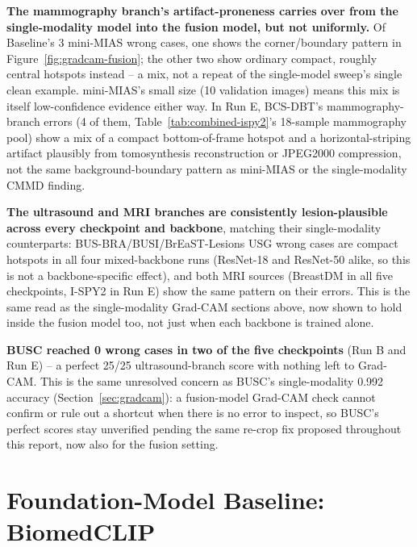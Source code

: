 \documentclass[11pt]{article}
\begin{document}
\textbf{The mammography branch's artifact-proneness carries over from the
single-modality model into the fusion model, but not uniformly.} Of
Baseline's 3 mini-MIAS wrong cases, one shows the corner/boundary pattern in
Figure~\ref{fig:gradcam-fusion}; the other two show ordinary compact,
roughly central hotspots instead -- a mix, not a repeat of the single-model
sweep's single clean example. mini-MIAS's small size (10 validation images)
means this mix is itself low-confidence evidence either way. In Run E,
BCS-DBT's mammography-branch errors (4 of them, Table~\ref{tab:combined-ispy2}'s
18-sample mammography pool) show a mix of a compact bottom-of-frame hotspot
and a horizontal-striping artifact plausibly from tomosynthesis
reconstruction or {JPEG2000} compression, not the same background-boundary
pattern as mini-MIAS or the single-modality {CMMD} finding.

\textbf{The ultrasound and {MRI} branches are consistently lesion-plausible
across every checkpoint and backbone}, matching their single-modality
counterparts: BUS-BRA/BUSI/BrEaST-Lesions {USG} wrong cases are compact
hotspots in all four mixed-backbone runs (ResNet-18 and ResNet-50 alike, so
this is not a backbone-specific effect), and both {MRI} sources (BreastDM in
all five checkpoints, {I-SPY2} in Run E) show the same pattern on their
errors. This is the same read as the single-modality Grad-CAM sections above,
now shown to hold inside the fusion model too, not just when each backbone
is trained alone.

\textbf{BUSC reached 0 wrong cases in two of the five checkpoints} (Run B
and Run E) -- a perfect 25/25 ultrasound-branch score with nothing left to
Grad-CAM. This is the same unresolved concern as BUSC's single-modality
0.992 accuracy (Section~\ref{sec:gradcam}): a fusion-model Grad-CAM check
cannot confirm or rule out a shortcut when there is no error to inspect, so
BUSC's perfect scores stay unverified pending the same re-crop fix proposed
throughout this report, now also for the fusion setting.

\section{Foundation-Model Baseline: BiomedCLIP}
\label{sec:biomedclip}
\end{document}
